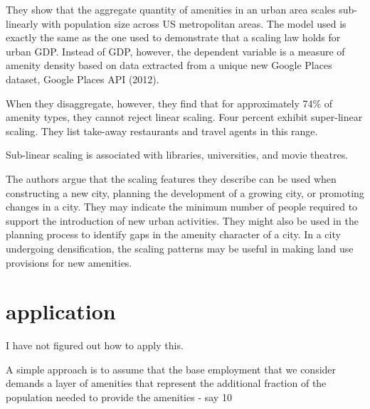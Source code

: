 They show that the aggregate quantity of amenities in an urban area  scales sub-linearly  with population size across US metropolitan areas. The model used is exactly the same as the one used to demonstrate that a scaling law holds for  urban GDP. Instead of GDP, however, the dependent variable is a measure of amenity density based on data extracted from a unique new Google Places dataset, Google Places API (2012).

When they disaggregate, however, they find that for approximately 74\% of amenity types, they cannot reject linear scaling. Four percent exhibit super-linear scaling. They list take-away restaurants and travel agents in this range. 

Sub-linear scaling is associated with libraries, universities, and movie theatres.

The authors argue that the scaling features they describe can be used when constructing a new city, planning the development of a growing city, or promoting changes in a city. They may indicate the minimum number of people required to support the introduction of new urban activities. They might also be used in the planning process to identify gaps in the amenity character of a city. In a city undergoing densification, the scaling patterns may be useful in  making land use provisions for new amenities.

\section{application}
I have not figured out how to apply this. 

A simple approach is to assume that the base employment that we consider demands a layer of amenities that represent the additional fraction of  the population needed to provide the amenities - say 10%